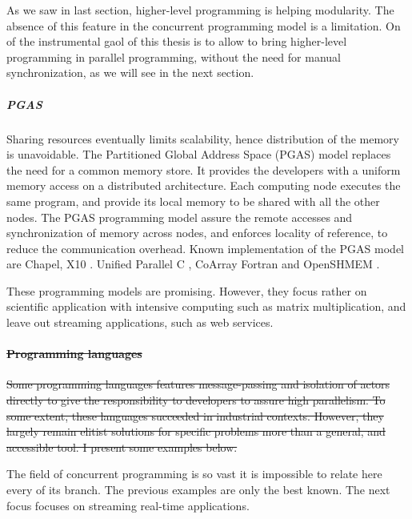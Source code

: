 
As we saw in last section, higher-level programming is helping modularity.
The absence of this feature in the concurrent programming model is a limitation.
On of the instrumental gaol of this thesis is to allow to bring higher-level programming in parallel programming, without the need for manual synchronization, as we will see in the next section.

\subparagraph{PGAS}

Sharing resources eventually limits scalability, hence distribution of the memory is unavoidable.
The Partitioned Global Address Space (PGAS) model replaces the need for a common memory store.
It provides the developers with a uniform memory access on a distributed architecture.
Each computing node executes the same program, and provide its local memory to be shared with all the other nodes.
The PGAS programming model assure the remote accesses and synchronization of memory across nodes, and enforces locality of reference, to reduce the communication overhead.
Known implementation of the PGAS model are 
Chapel\cite{Chamberlain2007},
X10 \cite{Charles2005}.
Unified Parallel C \cite{El-Ghazawi2006},
CoArray Fortran \cite{Numrich1998} and
OpenSHMEM \cite{Chapman2010}.

These programming models are promising.
However, they focus rather on scientific application with intensive computing such as matrix multiplication, and leave out streaming applications, such as web services.

\paragraph{\sout{Programming languages}} \label{chpater3:concurrent-programming:programming-languages}


\sout{Some programming languages features message-passing and isolation of actors directly to give the responsibility to developers to assure high parallelism.
To some extent, these languages succeeded in industrial contexts.
However, they largely remain elitist solutions for specific problems more than a general, and accessible tool.
I present some examples below.}


The field of concurrent programming is so vast it is impossible to relate here every of its branch.
The previous examples are only the best known.
The next focus focuses on streaming real-time applications.




